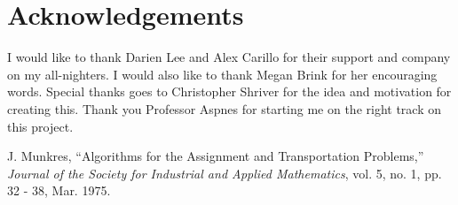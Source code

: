\documentclass[letterpaper]{article}
\begin{document}
\section*{Acknowledgements}
I would like to thank Darien Lee and Alex Carillo for their support and company on my all-nighters. I would also like to
thank Megan Brink for her encouraging words. Special thanks goes to Christopher Shriver for the idea and motivation for
creating this. Thank you Professor Aspnes for starting me on the right track on this project.






\begin{thebibliography}{11}
       J. Munkres,
        ``Algorithms for the Assignment and Transportation Problems,''
        \emph{Journal of the Society for Industrial and Applied Mathematics},
        vol. 5, no. 1, pp. 32 - 38, Mar. 1975.

\end{thebibliography}
\end{document}

